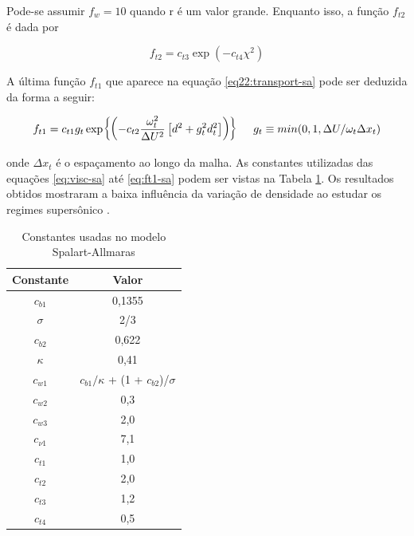 Pode-se assumir $f_w = 10$ quando r é um valor grande. Enquanto isso, a função $f_{t2}$ é dada por

\begin{equation}
    f_{t2} = c_{t3}\exp{(-c_{t4}\chi^2)}
\end{equation}

A última função $f_{t1}$ que aparece na equação \ref{eq22:transport-sa} pode ser deduzida da forma a seguir:

\begin{equation}
    \label{eq:ft1-sa}
    f_{t1} = c_{t1}g_{t} \exp{\left(-c_{t2}\frac{\omega_{t}^{2}}{\Delta U^2}\left[d^{2} + g_{t}^{2}d_{t}^{2}\right]\right)} \hspace{5mm} g_t \equiv min(0,1, \Delta U/\omega_t \Delta x_t)
\end{equation}

onde $\Delta x_t$ é o espaçamento ao longo da malha. As constantes utilizadas das equações \ref{eq:visc-sa} até \ref{eq:ft1-sa} podem ser vistas na Tabela \ref{tab:tabela-constantes-spalart-allmaras}. Os resultados obtidos mostraram a baixa influência da variação de densidade ao estudar os regimes supersônico \cite{Spalart1992}.

\begin{table}[ht]
\centering
\caption[Constantes usadas no modelo Spalart-Allmaras \cite{Spalart1992}]{Constantes usadas no modelo Spalart-Allmaras \cite{Spalart1992}}
\vspace{0.5cm}
\begin{tabular}{c|c}
 
Constante & Valor \\
\hline
$c_{b1}$ & 0,1355 \\
$\sigma$ & 2/3 \\
$c_{b2}$ & 0,622 \\
$\kappa$ & 0,41 \\
$c_{w1}$ & $c_{b1}/\kappa$ + (1 + $c_{b2}$)/$\sigma$ \\
$c_{w2}$ & 0,3 \\
$c_{w3}$ & 2,0 \\
$c_{\nu 1}$ & 7,1 \\
$c_{t1}$ & 1,0 \\
$c_{t2}$ & 2,0 \\
$c_{t3}$ & 1,2 \\
$c_{t4}$ & 0,5 \\

\end{tabular}
\label{tab:tabela-constantes-spalart-allmaras}
\end{table}

